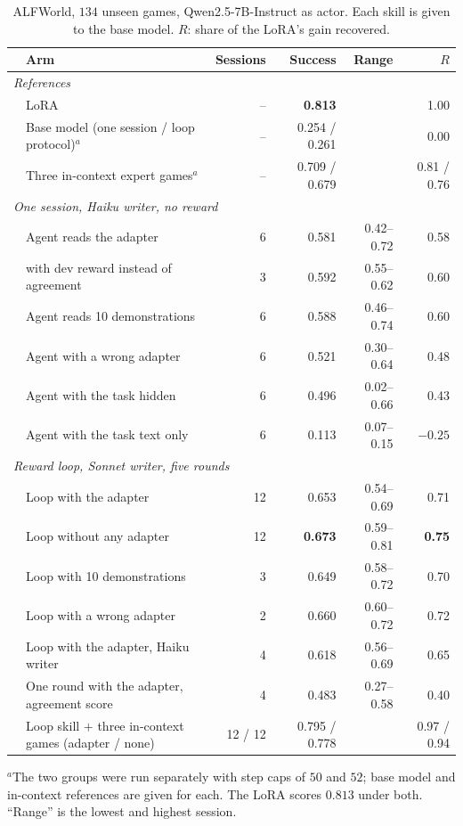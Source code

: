 \documentclass[11pt]{article}
\newcommand{\best}[1]{\textbf{#1}}
\begin{document}
\begin{table}[!htb]
\centering
\caption{ALFWorld, $134$ unseen games, Qwen2.5-7B-Instruct as actor. Each skill is given to the base model. $R$: share of the LoRA's gain recovered.}
\label{tab:axalf}
\small
\setlength{\tabcolsep}{4pt}
\begin{tabular}{llrrrr}
\toprule
 & Arm & Sessions & Success & Range & $R$\\
\midrule
\multicolumn{6}{l}{\emph{References}}\\
 & LoRA & -- & \best{0.813} & & 1.00\\
 & Base model (one session / loop protocol)$^a$ & -- & 0.254 / 0.261 & & 0.00\\
 & Three in-context expert games$^a$ & -- & 0.709 / 0.679 & & 0.81 / 0.76\\
\midrule
\multicolumn{6}{l}{\emph{One session, Haiku writer, no reward}}\\
 & Agent reads the adapter & 6 & 0.581 & 0.42--0.72 & 0.58\\
 & \quad with dev reward instead of agreement & 3 & 0.592 & 0.55--0.62 & 0.60\\
 & Agent reads 10 demonstrations & 6 & 0.588 & 0.46--0.74 & 0.60\\
 & Agent with a wrong adapter & 6 & 0.521 & 0.30--0.64 & 0.48\\
 & Agent with the task hidden & 6 & 0.496 & 0.02--0.66 & 0.43\\
 & Agent with the task text only & 6 & 0.113 & 0.07--0.15 & $-0.25$\\
\midrule
\multicolumn{6}{l}{\emph{Reward loop, Sonnet writer, five rounds}}\\
 & Loop with the adapter & 12 & 0.653 & 0.54--0.69 & 0.71\\
 & Loop without any adapter & 12 & \best{0.673} & 0.59--0.81 & \best{0.75}\\
 & Loop with 10 demonstrations & 3 & 0.649 & 0.58--0.72 & 0.70\\
 & Loop with a wrong adapter & 2 & 0.660 & 0.60--0.72 & 0.72\\
 & Loop with the adapter, Haiku writer & 4 & 0.618 & 0.56--0.69 & 0.65\\
 & One round with the adapter, agreement score & 4 & 0.483 & 0.27--0.58 & 0.40\\
\midrule
 & Loop skill $+$ three in-context games (adapter / none) & 12 / 12 & 0.795 / 0.778 & & 0.97 / 0.94\\
\bottomrule
\end{tabular}

\smallskip
\begin{minipage}{0.95\linewidth}\footnotesize
$^a$The two groups were run separately with step caps of $50$ and $52$; base model and in-context references are given for each. The LoRA scores
$0.813$ under both. ``Range'' is the lowest and highest session.
\end{minipage}
\end{table}
\end{document}
